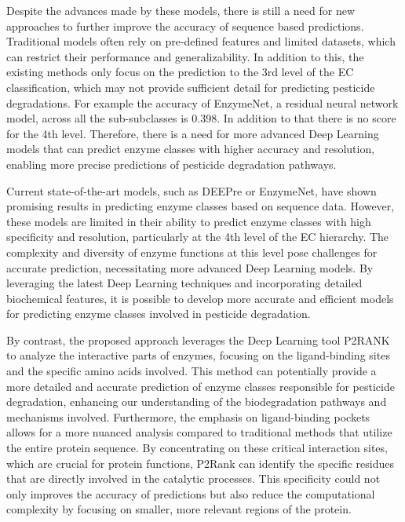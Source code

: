 Despite the advances made by these models, there is still a need for new approaches to further improve the accuracy of sequence based predictions. Traditional models often rely on pre-defined features and limited datasets, which can restrict their performance and generalizability. In addition to this, the existing methods only focus on the prediction to the 3rd level of the EC classification, which may not provide sufficient detail for predicting pesticide degradations. For example the accuracy of EnzymeNet, a residual neural network model, across all the sub-subclasses is 0.398. In addition to that there is no score for the 4th level. Therefore, there is a need for more advanced Deep Learning models that can predict enzyme classes with higher accuracy and resolution, enabling more precise predictions of pesticide degradation pathways. \autocite{watanabeEnzymeNetResidualNeural2023}

Current state-of-the-art models, such as DEEPre or EnzymeNet, have shown promising results in predicting enzyme classes based on sequence data. However, these models are limited in their ability to predict enzyme classes with high specificity and resolution, particularly at the 4th level of the EC hierarchy. The complexity and diversity of enzyme functions at this level pose challenges for accurate prediction, necessitating more advanced Deep Learning models. By leveraging the latest Deep Learning techniques and incorporating detailed biochemical features, it is possible to develop more accurate and efficient models for predicting enzyme classes involved in pesticide degradation.

By contrast, the proposed approach leverages the Deep Learning tool P2RANK to analyze the interactive parts of enzymes, focusing on the ligand-binding sites and the specific amino acids involved. This method can potentially provide a more detailed and accurate prediction of enzyme classes responsible for pesticide degradation, enhancing our understanding of the biodegradation pathways and mechanisms involved. Furthermore, the emphasis on ligand-binding pockets allows for a more nuanced analysis compared to traditional methods that utilize the entire protein sequence. By concentrating on these critical interaction sites, which are crucial for protein functions, P2Rank can identify the specific residues that are directly involved in the catalytic processes. This specificity could not only improves the accuracy of predictions but also reduce the computational complexity by focusing on smaller, more relevant regions of the protein. \autocite{krivakP2RankMachineLearning2018}
